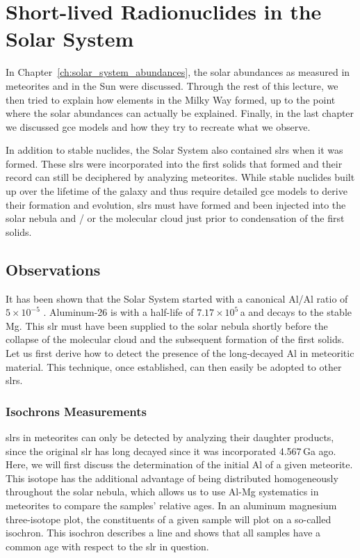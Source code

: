 
\chapter{Short-lived Radionuclides in the Solar System}

In Chapter~\ref{ch:solar_system_abundances}, the solar abundances as measured in meteorites and in the Sun were discussed. Through the rest of this lecture, we then tried to explain how elements in the Milky Way formed, up to the point where the solar abundances can actually be explained. Finally, in the last chapter we discussed \ac{gce} models and how they try to recreate what we observe. 

In addition to stable nuclides, the Solar System also contained \acfp{slr} when it was formed. These \acp{slr} were incorporated into the first solids that formed and their record can still be deciphered by analyzing meteorites. While stable nuclides built up over the lifetime of the galaxy and thus require detailed \ac{gce} models to derive their formation and evolution, \acp{slr} must have formed and been injected into the solar nebula and / or the molecular cloud just prior to condensation of the first solids. 


\section{Observations}

It has been shown that the Solar System started with a canonical Al/Al ratio of $5\times10^{-5}$ \citep{jacobsen08}. Aluminum-26 is  with a half-life of $7.17\times10^{5}$\,a and decays to the stable Mg. This \ac{slr} must have been supplied to the solar nebula shortly before the collapse of the molecular cloud and the subsequent formation of the first solids. Let us first derive how to detect the presence of the long-decayed Al in meteoritic material. This technique, once established, can then easily be adopted to other \acp{slr}. 

\subsection{Isochrons Measurements}

\acp{slr} in meteorites can only be detected by analyzing their daughter products, since the original \ac{slr} has long decayed since it was incorporated 4.567\,Ga ago. Here, we will first discuss the determination of the initial Al of a given meteorite. This isotope has the additional advantage of being distributed homogeneously throughout the solar nebula, which allows us to use Al-Mg systematics in meteorites to compare the samples' relative ages. In an aluminum magnesium three-isotope plot, the constituents of a given sample will plot on a so-called isochron. This isochron describes a line and shows that all samples have a common age with respect to the \ac{slr} in question.

